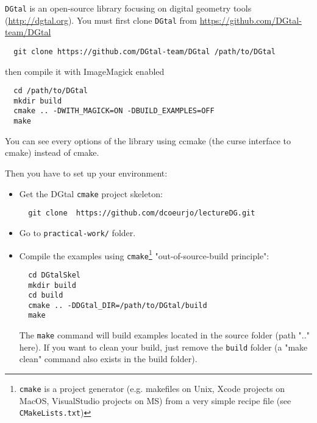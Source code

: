 \documentclass[a4paper, 11pt]{article}
\begin{document}
\par \texttt{DGtal} is an open-source library focusing on digital geometry tools (\url{http://dgtal.org}).
You must first clone \texttt{DGtal} from \url{https://github.com/DGtal-team/DGtal}
\begin{verbatim}
  git clone https://github.com/DGtal-team/DGtal /path/to/DGtal
\end{verbatim}
then compile it with ImageMagick enabled
\begin{verbatim}
  cd /path/to/DGtal
  mkdir build
  cmake .. -DWITH_MAGICK=ON -DBUILD_EXAMPLES=OFF
  make
\end{verbatim}
You can see every options of the library using ccmake (the curse interface to cmake) instead of cmake.

Then you have to set up your environment:
\begin{itemize}
	\item Get the DGtal \texttt{cmake} project skeleton:
\begin{verbatim}
  git clone  https://github.com/dcoeurjo/lectureDG.git
\end{verbatim}
\item Go to \texttt{practical-work/} folder.
	\item Compile the examples using \texttt{cmake}\footnote{\texttt{cmake} is a project generator (e.g. makefiles on Unix, Xcode projects on MacOS, VisualStudio projects on MS) from a very simple recipe file (see \texttt{CMakeLists.txt})} "out-of-source-build principle":
\begin{verbatim}
  cd DGtalSkel
  mkdir build 
  cd build
  cmake .. -DDGtal_DIR=/path/to/DGtal/build
  make
\end{verbatim}
	The \texttt{make} command will build examples located in the source folder (path ".." here). If you want to clean your build, just remove the \texttt{build} folder (a "make clean" command also exists in the build folder).
\end{itemize}
\end{document}
